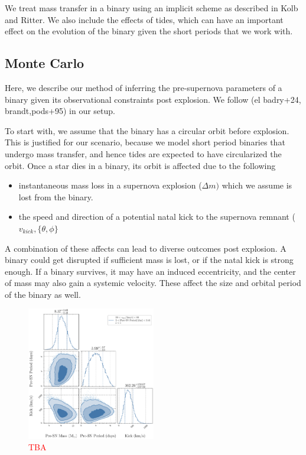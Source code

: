 \documentclass[linenumbers,trackchanges,twocolumn]{aastex701}
\newcommand{\red}{\textcolor{red}}
\begin{document}
We treat mass transfer in a binary using an implicit scheme as described in Kolb and Ritter. We also include the effects of tides, which can have an important effect on the evolution of the binary given the short periods that we work with. 

\subsection{Monte Carlo}

Here, we describe our method of inferring the pre-supernova parameters of a binary given its observational constraints post explosion. We follow (el badry+24, brandt,pods+95) in our setup. 

To start with, we assume that the binary has a circular orbit before explosion. This is justified for our scenario, because we model short period binaries that undergo mass transfer, and hence tides are expected to have circularized the orbit. Once a star dies in a binary, its orbit is affected due to the following

\begin{itemize}
    \item instantaneous mass loss in a supernova explosion ($\Delta m)$ which we assume is lost from the binary. 
    \item the speed and direction of a potential natal kick to the supernova remnant ($v_{kick}, \{\theta,\phi\}$
\end{itemize}

A combination of these affects can lead to diverse outcomes post explosion. A binary could get disrupted if sufficient mass is lost, or if the natal kick is strong enough. If a binary survives, it may have an induced eccentricity, and the center of mass may also gain a systemic velocity. These affect the size and orbital period of the binary as well. 

\begin{figure}[htbp]
    \centering
    \includegraphics[width=0.5\textwidth]{xrb-monte-carlo-mass-period-kick.pdf}
    \caption{\red{TBA}}
    \label{fig:xrb_monte_carlo}
\end{figure}
\end{document}
